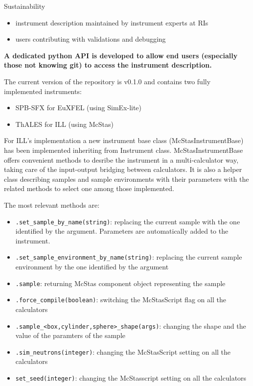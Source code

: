 \documentclass[11pt, a4paper]{article}
\begin{document}
   {Sustainability}
    \begin{itemize}
    \item instrument description maintained by instrument experts at RIs
    \item users contributing with validations and debugging %
    \end{itemize}
 
  {\bfseries A dedicated python API is developed to allow end users (especially those not knowing git) to access the instrument description.}

The current version of the repository is v0.1.0 and contains two fully implemented instruments:
\begin{itemize}
 \item SPB-SFX for EuXFEL (using SimEx-lite)
\item ThALES for ILL (using McStas)
\end{itemize}

For ILL's implementation a new instrument base class (McStasInstrumentBase) has been implemented inheriting from \libpyvinyl Instrument class. McStasInstrumentBase offers convenient methods to desribe the instrument in a multi-calculator way, taking care of the input-output bridging between calculators. It is also a helper class describing samples and sample environments with their parameters with the related methods to select one among those implemented.

The most relevant methods are:
\begin{itemize}
\item \verb|.set_sample_by_name(string)|: replacing the current sample with the one identified by the argument. Parameters are automatically added to the instrument.
\item \verb|.set_sample_environment_by_name(string)|: replacing the current sample environment by the one identified by the argument
\item \verb|.sample|: returning McStas component object representing the sample
\item \verb|.force_compile(boolean)|: switching the McStasScript flag on all the calculators
\item \verb|.sample_<box,cylinder,sphere>_shape(args)|: changing the shape and the value of the paramters of the sample
\item \verb|.sim_neutrons(integer)|: changing the McStasScript setting on all the calculators
\item \verb|set_seed(integer)|: changing the McStasscript setting on all the calculators
\end{itemize}
\end{document}
